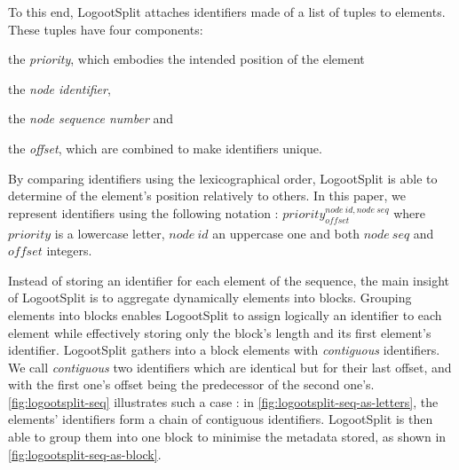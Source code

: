 \documentclass[sigplan,10pt]{acmart}
\newcommand{\trm}[1]{\mathit{#1}}
\newcommand{\id}[4]{$\trm{#1}^{\trm{#2}, \trm{#3}}_{\trm{#4}}$}
\begin{document}
To this end, LogootSplit attaches identifiers made of a list of tuples to elements.
These tuples have four components:
\begin{enumerate*}
    \item the \emph{priority}, which embodies the intended position of the element
    \item the \emph{node identifier},
    \item the \emph{node sequence number} and
    \item the \emph{offset}, which are combined to make identifiers unique.
\end{enumerate*}
By comparing identifiers using the lexicographical order, LogootSplit is able to determine of the element's position relatively to others.
In this paper, we represent identifiers using the following notation : \id{priority}{node~id}{node~seq}{offset} where $\trm{priority}$ is a lowercase letter, $\trm{node~id}$ an uppercase one and both $\trm{node~seq}$ and $\trm{offset}$ integers.

Instead of storing an identifier for each element of the sequence, the main insight of LogootSplit is to aggregate dynamically elements into blocks.
Grouping elements into blocks enables LogootSplit to assign logically an identifier to each element while effectively storing only the block's length and its first element's identifier.
LogootSplit gathers into a block elements with \emph{contiguous} identifiers.
We call \emph{contiguous} two identifiers which are identical but for their last offset, and with the first one’s offset being the predecessor of the second one's.
\autoref{fig:logootsplit-seq} illustrates such a case : in \autoref{fig:logootsplit-seq-as-letters}, the elements' identifiers form a chain of contiguous identifiers.
LogootSplit is then able to group them into one block to minimise the metadata stored, as shown in \autoref{fig:logootsplit-seq-as-block}.
\end{document}
